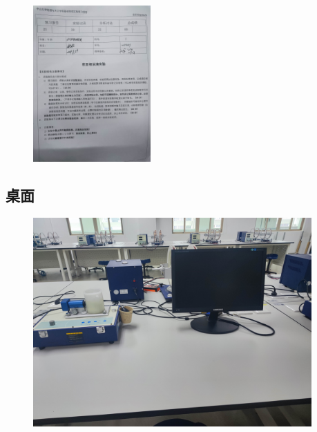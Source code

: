 \documentclass[dvipsnames, svgnames,a4paper,11pt]{article}
\begin{document}
\begin{figure}[H]
	\centering
	\includegraphics[width=0.4\textwidth]{实验7原件2.jpg}
\end{figure}
\subsection*{桌面}
\begin{figure}[H]
	\includegraphics[width=0.95\textwidth]{实验7桌面.jpg}
\end{figure}
\end{document}
